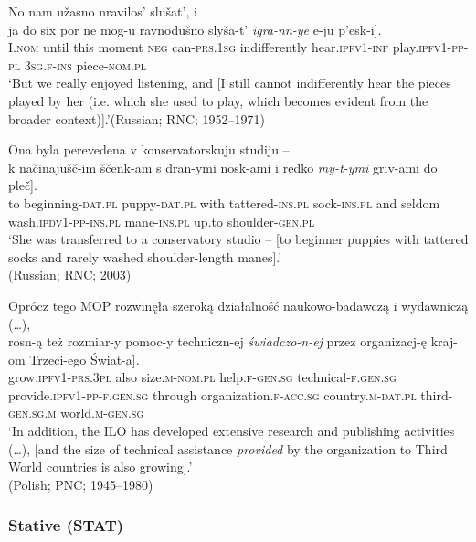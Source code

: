 \documentclass[output=paper]{langscibook}
\begin{document}
\ea\label{wiem:ex:played}{{No nam užasno nravilos’ slušat’, i} \\
\gll \minsp{[} {ja} {do} {six} {por} {ne} {mog-u} {ravnodušno} {slyša-t’} \textit{{igra-nn-ye}} {e-ju} {p’esk-i}].\\
{} I.\textsc{nom} until this moment \textsc{neg} can-\textsc{prs.1sg} indifferently hear.\textsc{ipfv1-inf} play.\textsc{ipfv1-pp-pl} \textsc{3sg.f-ins} piece-\textsc{nom.pl}\\
\glt ‘But we really enjoyed listening, and [I still cannot indifferently hear the pieces played by her (i.e. which she used to play, which becomes evident from the broader context)].’\hfill (Russian; RNC; 1952--1971)
}
\z

\ea\label{wiem:ex:washed}{
{Ona byla perevedena v konservatorskuju studiju} --\\
\gll \minsp{[} {k} {načinajušč-im} {ščenk-am} {s} {dran-ymi} {nosk-ami} {i} {redko} {\textit{my-t-ymi}} {griv-ami} {do} {pleč}].\\
{} to beginning-\textsc{dat.pl} puppy-\textsc{dat.pl} with tattered-\textsc{ins.pl} sock-\textsc{ins.pl} and seldom wash.\textsc{ipdv1-pp-ins.pl} mane-\textsc{ins.pl} up.to shoulder-\textsc{gen.pl}\\
\glt ‘She was transferred to a conservatory studio -- [to beginner puppies with tattered socks and rarely washed shoulder-length manes].’ \\
\hfill (Russian; RNC; 2003)
}
\z

\ea\label{wiem:ex:provided}{
{Oprócz tego MOP rozwinęła szeroką działalność naukowo-badawczą i wydawniczą (\dots)},\\
\gll \minsp{[} {rosn-ą} {też} {rozmiar-y} {pomoc-y} {techniczn-ej} \textit{{świadczo-n-ej}} {przez} {organizacj-ę} {kraj-om} {Trzeci-ego} {Świat-a}].\\
{} grow.\textsc{ipfv1-prs.3pl} also size.\textsc{m-nom.pl} help.\textsc{f-gen.sg} technical-\textsc{f.gen.sg} provide.\textsc{ipfv1-pp-f.gen.sg} through organization.\textsc{f-acc.sg} country.\textsc{m-dat.pl} third-\textsc{gen.sg.m} world.\textsc{m-gen.sg}\\
\glt ‘In addition, the ILO has developed extensive research and publishing activities (…), [and the size of technical assistance \textit{provided} by the organization to Third World countries is also growing].’\\ 
\hfill (Polish; PNC; 1945--1980)
}
\z

\subsubsection{Stative (STAT)}\largerpage[1.75]
\end{document}
